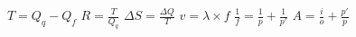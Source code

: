  \newcommand{\escalakelvin}{$T_K = T_C + 273$}
 \newcommand{\dilatacaolinear}{$\Delta L = L_0 \times \alpha \times \Delta t$}
 \newcommand{\dilatacaosuperficial}{$\Delta A = A_0 \times \beta \times \Delta t$}
 \newcommand{\dilatacaovolumetrica}{$\Delta V = V_0 \times \gamma \times \Delta t$}
 \newcommand{\capacidadetermica}{$C = m \times c$}
 \newcommand{\calorsensivel}{$Q = m \times c \times \Delta t$}
 \newcommand{\calorlatente}{$Q = m \times L$}
 \newcommand{\energiainterna}{$\Delta U = Q - T$}
 $T = Q_q - Q_f$
 $R = \frac{T}{Q_q}$
 $\Delta S = \frac{\Delta Q}{T}$
 $v = \lambda \times f$
 $\frac{1}{f}=\frac{1}{p}+\frac{1}{p'}$
 $A=\frac{i}{o}+\frac{p'}{p}$
